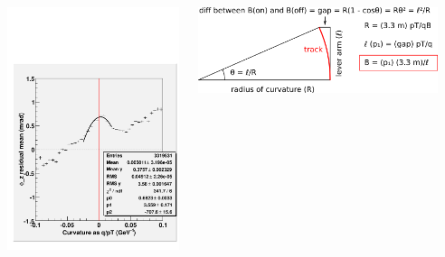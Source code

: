 \documentclass[compress]{beamer}
\begin{document}
\begin{frame}
\begin{columns}
\hfill \includegraphics[width=0.666\linewidth]{phizresid_profile_pol2fit.pdf}

\vspace{0.5 cm}
\includegraphics[width=\linewidth]{from_p1_to_B.png}

\vspace{0.2 cm}
\mbox{ }
\end{columns}
\end{frame}
\end{document}
